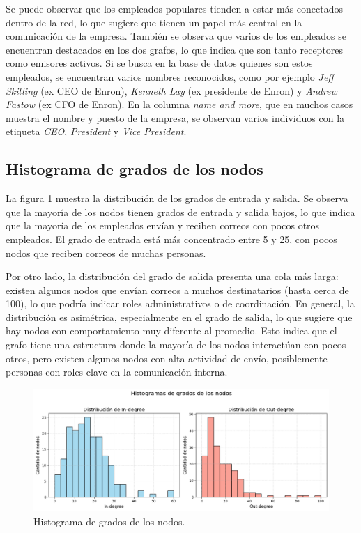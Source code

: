 \documentclass{article}
\begin{document}
Se puede observar que los empleados populares tienden a estar más conectados dentro de la red, lo que sugiere que tienen un papel más central en la comunicación de la empresa. También se observa que varios de los empleados se encuentran destacados en los dos grafos, lo que indica que son tanto receptores como emisores activos. Si se busca en la base de datos quienes son estos empleados, se encuentran varios nombres reconocidos, como por ejemplo \textit{Jeff Skilling} (ex CEO de Enron), \textit{Kenneth Lay} (ex presidente de Enron) y \textit{Andrew Fastow} (ex CFO de Enron). En la columna \textit{name and more}, que en muchos casos muestra el nombre y puesto de la empresa, se observan varios individuos con la etiqueta \textit{CEO}, \textit{President} y \textit{Vice President}.

\subsection{Histograma de grados de los nodos}

La figura \ref{fig:histogramas_grados} muestra la distribución de los grados de entrada y salida. Se observa que la mayoría de los nodos tienen grados de entrada y salida bajos, lo que indica que la mayoría de los empleados envían y reciben correos con pocos otros empleados. El grado de entrada está más concentrado entre 5 y 25, con pocos nodos que reciben correos de muchas personas.

Por otro lado, la distribución del grado de salida presenta una cola más larga: existen algunos nodos que envían correos a muchos destinatarios (hasta cerca de 100), lo que podría indicar roles administrativos o de coordinación. En general, la distribución es asimétrica, especialmente en el grado de salida, lo que sugiere que hay nodos con comportamiento muy diferente al promedio. Esto indica que el grafo tiene una estructura donde la mayoría de los nodos interactúan con pocos otros, pero existen algunos nodos con alta actividad de envío, posiblemente personas con roles clave en la comunicación interna.

\begin{figure}[htb]
    \centering
    \includegraphics[width=0.8\linewidth]{imagenes/ej1/histogramas_grados_nodos.png}
    \caption{Histograma de grados de los nodos.}
    \label{fig:histogramas_grados}
\end{figure}
\end{document}
